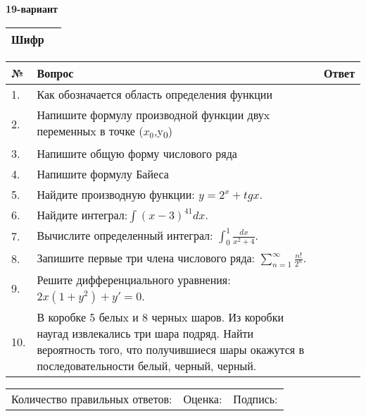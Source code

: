 \documentclass{article}
\begin{document}
  \egroup
  
  \newpage
  
  
  \textbf{19-вариант}\\
  
  \bgroup
  \def\arraystretch{1.6} %
  
  \begin{tabular}{|m{5.7cm}|m{9.5cm}|}
  \hline
  Шифр & \\
  \hline
  \end{tabular}
  
  \vspace{1cm}
  
  \begin{tabular}{|m{0.7cm}|m{10cm}|m{4cm}|}
  \hline
  № & Вопрос & Ответ \\
  \hline
  1. & Как обозначается область определения функции &  \\
  \hline
  2. & Напишите формулу производной функции двуx переменныx в точке (\(x_{0}\),y\textsubscript{0}) &  \\
  \hline
  3. & Напишите общую форму числового ряда &  \\
  \hline
  4. & Напишите формулу Байеса &  \\
  \hline
  5. & Найдите производную функции: \(y = 2^{x} + tgx\). &  \\
  \hline
  6. & Найдите интеграл:\(\int{(x - 3)^{41}}dx\). &  \\
  \hline
  7. & Вычислите определенный интеграл: \(\int_{0}^{1}\frac{dx}{x^{2} + 4}\). &  \\
  \hline
  8. & Запишите первые три члена числового ряда: \(\sum_{n = 1}^{\infty}\frac{n!}{2^{n}}\). &  \\
  \hline
  9. & Решите дифференциального уравнения: \(2x\left( 1 + y^{2} \right) + y' = 0\). &  \\
  \hline
  10. & В коробке 5 белыx и 8 черныx шаров. Из коробки наугад извлекались три шара подряд. Найти вероятность того, что получившиеся шары окажутся в последовательности белый, черный, черный. &  \\
  \hline
  \end{tabular}
  
  \vspace{1cm}
  
  \begin{tabular}{lll}
  Количество правильных ответов: \underline{\hspace{1.5cm}} & 
  Оценка: \underline{\hspace{1.5cm}} & 
  Подпись: \underline{\hspace{2cm}} \\
  \end{tabular}
  
\end{document}
